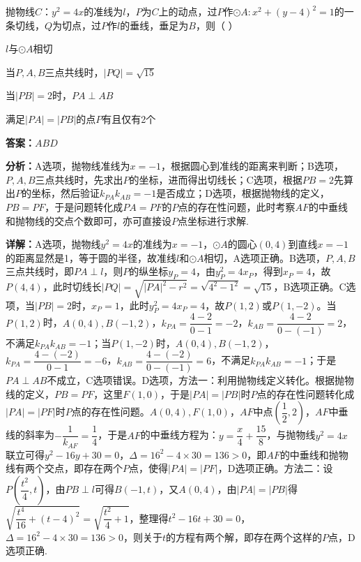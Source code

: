 \begin{question}[points=6]
抛物线$C：y^2=4x$的准线为$l$，$P$为$C$上的动点，过$P$作$\odot A: x^2+(y-4)^2=1$的一条切线，$Q$为切点，过$P$作$l$的垂线，垂足为$B$，则（ ）
\begin{choices}
  \item $l$与$\odot A$相切
  \item 当$P,A,B$三点共线时，$|PQ|=\sqrt{15}$
  \item 当$|PB|=2$时，$PA\perp AB$
  \item 满足$|PA|=|PB|$的点$P$有且仅有2个
\end{choices}
\begin{solution}
\textbf{答案：}$ABD$

\textbf{分析：}A选项，抛物线准线为$x=-1$，根据圆心到准线的距离来判断；B选项，$P,A,B$三点共线时，先求出$P$的坐标，进而得出切线长；C选项，根据$PB=2$先算出$P$的坐标，然后验证$k_{PA}k_{AB}=-1$是否成立；D选项，根据抛物线的定义，$PB=PF$，于是问题转化成$PA=PF$的$P$点的存在性问题，此时考察$AF$的中垂线和抛物线的交点个数即可，亦可直接设$P$点坐标进行求解.

\textbf{详解：}A选项，抛物线$y^2=4x$的准线为$x=-1$，$\odot A$的圆心$(0,4)$到直线$x=-1$的距离显然是1，等于圆的半径，故准线$l$和$\odot A$相切，A选项正确。B选项，$P,A,B$三点共线时，即$PA\perp l$，则$P$的纵坐标$y_P=4$，由$y_P^2=4x_P$，得到$x_P=4$，故$P(4,4)$，此时切线长$|PQ|=\sqrt{|PA|^2-r^2}=\sqrt{4^2-1^2}=\sqrt{15}$，B选项正确。C选项，当$|PB|=2$时，$x_P=1$，此时$y_P^2=4x_P=4$，故$P(1,2)$或$P(1,-2)$。当$P(1,2)$时，$A(0,4),B(-1,2)$，$k_{PA}=\dfrac{4-2}{0-1}=-2$，$k_{AB}=\dfrac{4-2}{0-(-1)}=2$，不满足$k_{PA}k_{AB}=-1$；当$P(1,-2)$时，$A(0,4),B(-1,2)$，$k_{PA}=\dfrac{4-(-2)}{0-1}=-6$，$k_{AB}=\dfrac{4-(-2)}{0-(-1)}=6$，不满足$k_{PA}k_{AB}=-1$；于是$PA\perp AB$不成立，C选项错误。D选项，方法一：利用抛物线定义转化。根据抛物线的定义，$PB=PF$，这里$F(1,0)$，于是$|PA|=|PB|$时$P$点的存在性问题转化成$|PA|=|PF|$时$P$点的存在性问题。$A(0,4),F(1,0)$，$AF$中点$(\dfrac{1}{2},2)$，$AF$中垂线的斜率为$-\dfrac{1}{k_{AF}}=\dfrac{1}{4}$，于是$AF$的中垂线方程为：$y=\dfrac{x}{4}+\dfrac{15}{8}$，与抛物线$y^2=4x$联立可得$y^2-16y+30=0$，$\Delta=16^2-4\times30=136>0$，即$AF$的中垂线和抛物线有两个交点，即存在两个$P$点，使得$|PA|=|PF|$，D选项正确。方法二：设$P\left(\dfrac{t^2}{4},t\right)$，由$PB\perp l$可得$B(-1,t)$，又$A(0,4)$，由$|PA|=|PB|$得$\sqrt{\dfrac{t^4}{16}+(t-4)^2}=\sqrt{\dfrac{t^2}{4}+1}$，整理得$t^2-16t+30=0$，$\Delta=16^2-4\times30=136>0$，则关于$t$的方程有两个解，即存在两个这样的$P$点，D选项正确.
\end{solution}
\end{question}

